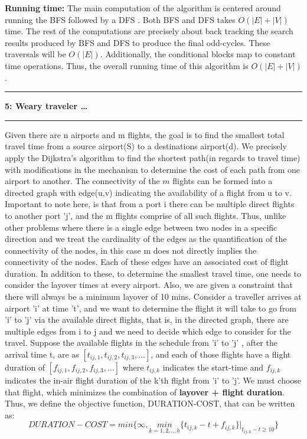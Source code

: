 \documentclass{article}
\newcommand\question[2]{\vspace{.25in}\hrule\textbf{#1: #2}\hrule\vspace{.10in}}
\newcommand\runtime{\vspace{.10in}\textbf{Running time: }}
\begin{document}
\runtime 
   The main computation of the algorithm is centered around running the BFS followed by a DFS .  Both BFS and DFS takes $O(|E| + |V|)$ time. The rest of the computations are precisely about back tracking the search results produced by BFS and DFS to produce the final odd-cycles. These traversals will be $O(|E|)$. Additionally, the conditional blocks map to constant time operations. Thus, the overall running time of this algorithm is $O(|E| + |V|)$. \newline


\question{5}{Weary traveler \dots}
  Given there are n airports and m flights, the goal is to find the smallest total travel time from a source airport(S) to a destinations airport(d). \newline
We precisely apply the Dijkstra's algorithm to find the shortest path(in regards to travel time) with modifications in the mechanism to determine the cost of each path from one airport to another. The connectivity of the $m$ flights can be formed into a directed graph with edge(u,v) indicating the availability of a flight from u to v. Important to note here, is that from a port i there can be multiple direct flights to  another port 'j', and the m flights comprise of all such flights. Thus, unlike other problems where there is a single edge between two nodes in a specific direction and we treat the cardinality of the edges as the quantification of the connectivity of the nodes, in this case m does not directly implies the connectivity of the nodes. Each of these edges have an associated cost of flight duration. \newline
In addition to these, to determine the smallest travel time, one needs to consider the layover times at every airport. Also, we are given a constraint that there will always be a minimum layover of 10 mins. \newline
Consider a traveller arrives at airport 'i' at time 't', and we want to determine the flight it will take to go from 'i' to 'j' via the available direct flights, that is, in the directed graph, there are multiple edges from i to j and we need to decide which edge to consider for the travel. Suppose the available flights in the schedule from 'i' to 'j' , after the arrival time t, are as $[t_{ij,1}, t_{ij,2}, t_{ij,3}, \dots]$, and each of those flights have a flight duration of $[f_{ij,1}, f_{ij,2}, f_{ij,3}, \dots]$ where $t_{ij,k}$ indicates the start-time and $f_{ij,k}$ indicates the in-air flight duration of the k'th flight from 'i' to 'j'. We must choose that flight, which minimizes the combination of \textbf {layover + flight duration}. \newline
  Thus, we define the objective function, DURATION-COST, that can be written as: \newline
  \begin{equation}
	  DURATION-COST = min \bigg \{ \infty, \underset{k=1,2,..,h}{min}{\{t_{ij,k} - t + f_{ij,k}\}\bigg |_{t_{ij,k}-t \geq 10}}  \bigg \}
  \end{equation}
\end{document}
